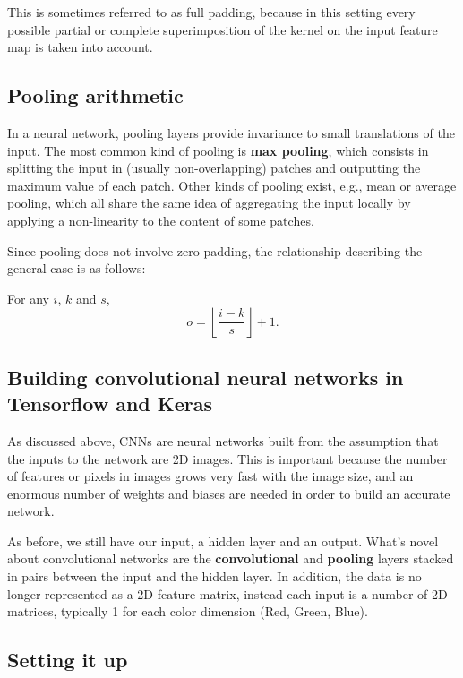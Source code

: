 \documentclass[%
oneside,                 %
final,                   %
10pt]{article}
\begin{document}
This is sometimes referred to as full padding, because in this
setting every possible partial or complete superimposition of the kernel on the
input feature map is taken into account. 

\subsection{Pooling arithmetic}

In a neural network, pooling layers provide invariance to small translations of
the input. The most common kind of pooling is \textbf{max pooling}, which
consists in splitting the input in (usually non-overlapping) patches and
outputting the maximum value of each patch. Other kinds of pooling exist, e.g.,
mean or average pooling, which all share the same idea of aggregating the input
locally by applying a non-linearity to the content of some patches.

Since pooling does not involve
zero padding, the relationship describing the general case is as follows:

For any $i$, $k$ and $s$,
\begin{equation*}
    o = \left\lfloor \frac{i - k}{s} \right\rfloor + 1.
\end{equation*}

\subsection{Building convolutional neural networks in Tensorflow and Keras}

As discussed above, CNNs are neural networks built from the assumption that the inputs
to the network are 2D images. This is important because the number of features or pixels in images
grows very fast with the image size, and an enormous number of weights and biases are needed in order to build an accurate network.  

As before, we still have our input, a hidden layer and an output. What's novel about convolutional networks
are the \textbf{convolutional} and \textbf{pooling} layers stacked in pairs between the input and the hidden layer.
In addition, the data is no longer represented as a 2D feature matrix, instead each input is a number of 2D
matrices, typically 1 for each color dimension (Red, Green, Blue). 

\subsection{Setting it up}
\end{document}
